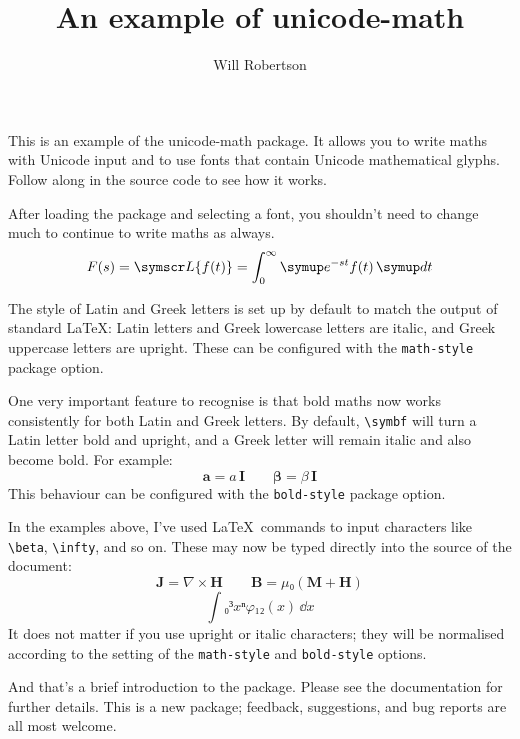\documentclass{article}
\begin{document}
\title{An example of \textsf{unicode-math}}
\author{Will Robertson}
\maketitle

This is an example of the \textsf{unicode-math} package.
It allows you to write maths with Unicode input and to use fonts that contain Unicode mathematical glyphs. Follow along in the source code to see how it works.

After loading the package and selecting a font, you shouldn't need to change much to continue to write maths as always.
\[
   F(s)=\symscr L \{f(t)\}=\int_0^\infty \symup e^{-st}f(t)\,\symup d t
\]

The style of Latin and Greek letters is set up by default to match the output of standard \LaTeX: Latin letters and Greek lowercase letters are italic, and Greek uppercase letters are upright. These can be configured with the \texttt{math-style} package option.

One very important feature to recognise is that bold maths now works consistently for both Latin and Greek letters. By default, \verb|\symbf| will turn a Latin letter bold and upright, and a Greek letter will remain italic and also become bold. For example:
\[
  \symbf{a} = a\,\symbf{I} \qquad \symbf{\beta} = \beta\,\symbf{I}
\]
This behaviour can be configured with the \texttt{bold-style} package option.

In the examples above, I've used \LaTeX\ commands to input characters like \verb|\beta|, \verb|\infty|, and so on. These may now be typed directly into the source of the document:
\[
   𝐉 = ∇×𝐇 \qquad 𝐁 = μ₀(𝐌 + 𝐇)
\]
\[
  ∫₀³ xⁿφ₁₂(x)\,ⅆx
\]
It does not matter if you use upright or italic characters; they will be normalised according to the setting of the \texttt{math-style} and \texttt{bold-style} options.

And that's a brief introduction to the package. Please see the documentation for further details. This is a new package; feedback, suggestions, and bug reports are all most welcome.
\end{document}
